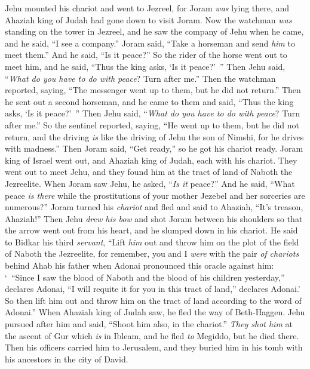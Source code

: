 \begin{biblechapter}
\verse Jehu mounted his chariot and went to Jezreel, for Joram \textit{was} lying there, and Ahaziah king of Judah had gone down to visit Joram.
\verse Now the watchman \textit{was} standing on the tower in Jezreel, and he saw the company of Jehu when he came, and he said, “I see a company.” Joram said, “Take a horseman and send \textit{him} to meet them.” And he said, “Is it peace?”
\verse So the rider of the horse went out to meet him, and he said, “Thus the king asks, ‘Is it peace?’ ” Then Jehu said, “\textit{What do you have to do with peace}? Turn after me.” Then the watchman reported, saying, “The messenger went up to them, but he did not return.”
\verse Then he sent out a second horseman, and he came to them and said, “Thus the king asks, ‘Is it peace?’ ” Then Jehu said, “\textit{What do you have to do with peace}? Turn after me.”
\verse So the sentinel reported, saying, “He went up to them, but he did not return, and the driving \textit{is} like the driving of Jehu the son of Nimshi, for he drives with madness.”
\verse Then Joram said, “Get ready,” so he got his chariot ready. Joram king of Israel went out, and Ahaziah king of Judah, each with his chariot. They went out to meet Jehu, and they found him at the tract of land of Naboth the Jezreelite.
\verse When Joram saw Jehu, he asked, “\textit{Is it} peace?” And he said, “What peace \textit{is there} while the prostitutions of your mother Jezebel and her sorceries are numerous?”
\verse Joram turned his \textit{chariot} and fled and said to Ahaziah, “It’s treason, Ahaziah!”
\verse Then Jehu \textit{drew his bow} and shot Joram between his shoulders so that the arrow went out from his heart, and he slumped down in his chariot.
\verse He said to Bidkar his third \textit{servant}, “Lift \textit{him} out and throw him on the plot of the field of Naboth the Jezreelite, for remember, you and I \textit{were} with the pair \textit{of chariots} behind Ahab his father when Adonai pronounced this oracle against him:
\verse ‘ “Since I saw the blood of Naboth and the blood of his children yesterday,” declares Adonai, “I will requite it for you in this tract of land,” declares Adonai.’ So then lift him out and throw him on the tract of land according to the word of Adonai.”
 When Ahaziah king of Judah saw, he fled the way of Beth-Haggen. Jehu pursued after him and said, “Shoot him also, in the chariot.” \textit{They shot him} at the ascent of Gur which \textit{is} in Ibleam, and he fled \textit{to} Megiddo, but he died there.
\verse Then his officers carried him to Jerusalem, and they buried him in his tomb with his ancestors in the city of David.

\end{biblechapter}
